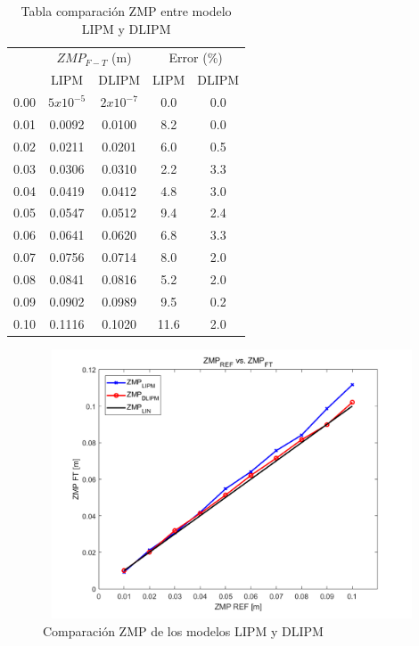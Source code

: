 \begin{table}[H]
\centering
\begin{tabular}{|c|c|c|c|c|}
\hline
\rowcolor[gray]{0.7} 
\cellcolor[gray]{0.7}  & \multicolumn{2}{c|}{\cellcolor[gray]{0.7}$ZMP_{F-T}$ (m)} & \multicolumn{2}{c|}{\cellcolor[gray]{0.7}Error (\%)} \\ 
\cline{2-5} 
\rowcolor[gray]{0.9}
\multirow{-2}{*}{\cellcolor[gray]{0.7}$ZMP_{ref}$ (m)} & LIPM & DLIPM & LIPM & DLIPM \\ 
\hline
0.00 & $5x10^{-5}$ & $2x10^{-7}$ & 0.0 & 0.0 \\ 
\hline
0.01 & 0.0092 & 0.0100 & 8.2 & 0.0 \\ 
\hline
0.02 & 0.0211 & 0.0201 & 6.0 & 0.5 \\ 
\hline
0.03 & 0.0306 & 0.0310 & 2.2 & 3.3 \\ 
\hline
0.04 & 0.0419 & 0.0412 & 4.8 & 3.0 \\ 
\hline
0.05 & 0.0547 & 0.0512 & 9.4 & 2.4 \\ 
\hline
0.06 & 0.0641 & 0.0620 & 6.8 & 3.3 \\ 
\hline
0.07 & 0.0756 & 0.0714 & 8.0 & 2.0 \\ 
\hline
0.08 & 0.0841 & 0.0816 & 5.2 & 2.0 \\ 
\hline
0.09 & 0.0902 & 0.0989 & 9.5 & 0.2 \\ 
\hline
0.10 & 0.1116 & 0.1020 & 11.6 & 2.0 \\ 
\hline
\end{tabular}
\caption{Tabla comparación ZMP entre modelo LIPM y DLIPM}
\label{tabla52}
\end{table}

\begin{figure}[H]
\centering
\includegraphics[width=13cm, height=8cm]{imagenes/apartado_5/511_compErrorModels}
\caption{Comparación ZMP de los modelos LIPM y DLIPM}
\label{figura513}
\end{figure}


